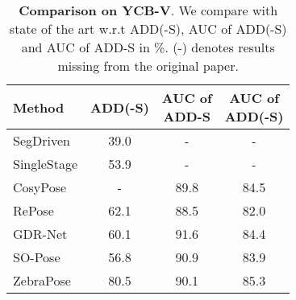 \begin{table}
  \centering
  \begin{tabular}{@{}l|c|c|c@{}}
    \toprule
     Method & ADD(-S) & \makecell{AUC of\\ADD-S} & \makecell{AUC of\\ADD(-S)} \\
    \midrule
    SegDriven\cite{2019segmentation} & 39.0 &  - &  -  \\
    SingleStage\cite{hu2020single} & 53.9 &  - &  - \\
    CosyPose~\cite{labbe2020cosypose} & - &  89.8 &  84.5 \\
    RePose~\cite{iwase2021repose} & 62.1 &  88.5 &  82.0 \\
    GDR-Net~\cite{wang2021gdr} & 60.1 & 91.6 &  84.4 \\
    SO-Pose~\cite{di2021so} & 56.8 &  90.9 &  83.9 \\
    ZebraPose~\cite{su2022zebrapose} & 80.5 &  90.1 & 85.3  \\
    \bottomrule
  \end{tabular}
  \caption{\textbf{Comparison on YCB-V}. We compare with state of the art w.r.t ADD(-S), AUC of ADD(-S) and AUC of ADD-S in \%. (-) denotes results missing from the original paper.}
  \label{tab:ycbv_results_table}
\end{table}